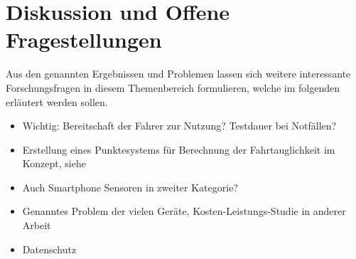 \section{Diskussion und Offene Fragestellungen}
\label{openChallenges}
Aus den genannten Ergebnissen und Problemen lassen sich weitere interessante Forschungsfragen in diesem Themenbereich formulieren, welche im folgenden erläutert werden sollen.

\begin{itemize}
	\item Wichtig: Bereitschaft der Fahrer zur Nutzung? Testdauer bei Notfällen?
	\item Erstellung eines Punktesystems für Berechnung der Fahrtauglichkeit im Konzept, siehe \cite{drivesafe}
	\item Auch Smartphone Sensoren in zweiter Kategorie? \cite{validationphysicalactivitytracking, bewegungserkennungsensoren}
	\item Genanntes Problem der vielen Geräte, Kosten-Leistungs-Studie in anderer Arbeit
	\item Datenschutz \cite{beurteilungskriterienleipzig, securityprivacyfitnesstracking}
\end{itemize}

